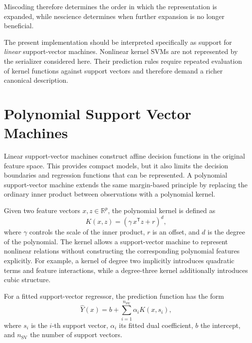 Miscoding therefore determines the order in which the representation is expanded, while nescience determines when further expansion is no longer beneficial.

The present implementation should be interpreted specifically as support for \emph{linear} support-vector machines. Nonlinear kernel SVMs are not represented by the serializer considered here. Their prediction rules require repeated evaluation of kernel functions against support vectors and therefore demand a richer canonical description.

%
%

\section{Polynomial Support Vector Machines}
\label{subsec:automl_polynomial_svm}


Linear support-vector machines construct affine decision functions in the original feature space. This provides compact models, but it also limits the decision boundaries and regression functions that can be represented. A polynomial support-vector machine extends the same margin-based principle by replacing the ordinary inner product between observations with a polynomial kernel.

Given two feature vectors $x,z \in \mathbb{R}^{p}$, the polynomial kernel is defined as
\[
K(x,z) = \left(\gamma\,x^\mathsf{T}z+r \right)^d,
\]
where $\gamma$ controls the scale of the inner product, $r$ is an offset, and \(d\) is the degree of the polynomial. The kernel allows a support-vector machine to represent nonlinear relations without constructing the corresponding polynomial features explicitly. For example, a kernel of degree two implicitly introduces quadratic terms and feature interactions, while a degree-three kernel additionally introduces cubic structure.

For a fitted support-vector regressor, the prediction function has the form
\[
\widehat{Y}(x) = b + \sum_{i=1}^{n_{\mathrm{SV}}} \alpha_i K(x,s_i),
\]
where $s_i$ is the $i$-th support vector, $\alpha_i$ its fitted dual coefficient, $b$ the intercept, and $n_{\mathrm{SV}}$ the number of support vectors.

